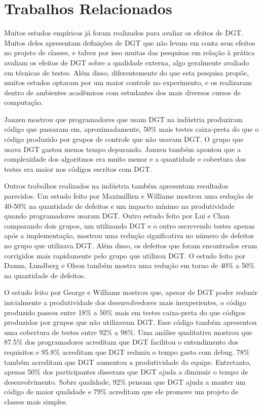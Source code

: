 \chapter{Trabalhos Relacionados}
\label{cap:trabalhos-relacionados}

Muitos estudos empíricos já foram realizados para avaliar os efeitos de DGT.
Muitos deles apresentam definições
de DGT que não levam em conta seus efeitos no projeto de classes, e talvez por isso muitas das 
pesquisas em relação à prática avaliam os efeitos de DGT sobre a qualidade 
externa, algo geralmente avaliado em técnicas de testes.
Além disso, diferentemente
do que esta pesquisa propõe, muitos estudos optaram por um
maior controle no experimento, e os realizaram dentro de ambientes acadêmicos 
com estudantes dos mais diversos cursos de computação.

Janzen \cite{janzen-arch-improvement} mostrou que programadores que usam DGT na 
indústria produziram código que passaram em, aproximadamente, 50\% mais testes 
caixa-preta do que o código produzido por grupos de controle que não usavam DGT.
O grupo que usava DGT gastou menos tempo depurando. Janzen também 
apontou que a complexidade dos algoritmos era muito menor e a quantidade e
cobertura dos testes era maior nos códigos escritos com DGT.

Outros trabalhos realizados na indústria também apresentam resultados parecidos.
Um estudo feito por Maximillien e Williams \cite{max-e-williams} mostrou uma
redução de 40-50\% na quantidade de defeitos e um impacto mínimo na
produtividade quando programadores usaram DGT. Outro estudo feito por Lui e
Chan \cite{lui-e-chan} comparando dois grupos, um utilizando DGT e o outro 
escrevendo testes apenas após a implementação, mostrou uma redução significativa 
no número de defeitos no grupo que utilizava DGT. 
Além disso, os defeitos que foram encontrados eram 
corrigidos mais rapidamente pelo grupo que utilizou DGT. O estudo feito por 
Damm, Lundberg e Olson \cite{damn-lundberg-e-olson} também mostra uma redução
em torno de 40\% a 50\% na quantidade de defeitos.

O estudo feito por George e Williams \cite{george-e-williams} mostrou que,
apesar de DGT poder reduzir inicialmente a produtividade dos desenvolvedores 
mais inexperientes, o código produzido passou entre 18\% a 50\% mais em testes 
caixa-preta do que códigos produzidos por grupos que não utilizavam DGT. Esse
código também apresentou uma cobertura de testes entre 92\% a 98\%. Uma análise
qualitativa mostrou que 87.5\% dos programadores acreditam que DGT facilitou o 
entendimento dos requisitos e 95.8\% acreditam que DGT reduziu o tempo gasto com
debug. 78\% também acreditam que DGT aumentou a produtividade da equipe. 
Entretanto, apenas 50\% dos participantes disseram que DGT ajuda a diminuir o tempo de 
desenvolvimento. Sobre qualidade, 92\% pensam que DGT ajuda a manter um
código de maior qualidade e 79\% acreditam que ele promove um projeto de classes mais simples.

